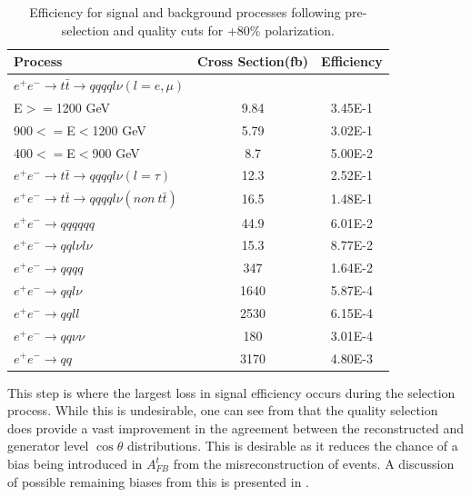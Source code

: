 \begin{table}
  \centering
  \begin{tabular}{l | c | c }
    \toprule
    Process     & Cross Section(fb) & Efficiency \\
    \midrule
    $e^+e^-\rightarrow t\bar{t} \rightarrow qqqql\nu (l=e,\mu)$&  &  \\
    E$>=$1200 GeV & 9.84 & 3.45E-1 \\
    900$<=$E$<$1200 GeV & 5.79 & 3.02E-1 \\
    400$<=$E$<$900 GeV & 8.7 & 5.00E-2 \\
    \midrule
    $e^+e^-\rightarrow t\bar{t} \rightarrow qqqql\nu (l=\tau)$& 12.3 & 2.52E-1\\
    \midrule
    $e^+e^-\rightarrow t\bar{t} \rightarrow qqqql\nu (non ~ t\bar{t})$& 16.5 & 1.48E-1\\
    \midrule
    $e^+e^-\rightarrow qqqqqq$ & 44.9 & 6.01E-2 \\
    \midrule
    $e^+e^-\rightarrow qql\nu l\nu$ & 15.3  & 8.77E-2 \\
    \midrule
    $e^+e^-\rightarrow qqqq$ & 347 & 1.64E-2 \\
    \midrule
    $e^+e^-\rightarrow qql\nu$ & 1640 & 5.87E-4 \\
    \midrule
    $e^+e^-\rightarrow qqll$ & 2530 & 6.15E-4 \\
    \midrule
    $e^+e^-\rightarrow qq\nu\nu$ & 180 & 3.01E-4 \\
    \midrule
    $e^+e^-\rightarrow qq$ & 3170 & 4.80E-3 \\
    \bottomrule
  \end{tabular}
  \caption{Efficiency for signal and background processes following pre-selection and quality cuts for +80\% polarization.}
  \label{table:topqualpos}
\end{table}

This step is where the largest loss in signal efficiency occurs during the selection process. While this is undesirable, one can see from  that the quality selection does provide a vast improvement in the agreement between the reconstructed and generator level $\cos\theta$ distributions. This is desirable as it reduces the chance of a bias being introduced in $A_{FB}^t$ from the misreconstruction of events. A discussion of possible remaining biases from this is presented in . 

